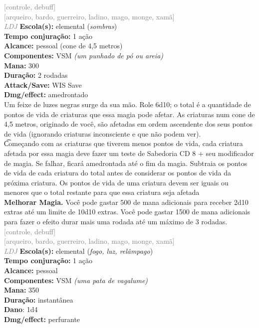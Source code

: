 \documentclass{RPG_Adventure}[2021/10/20]
\begin{document}
{\scriptsize \textcolor{gray}{[controle, debuff]\\}}
{\scriptsize \textcolor{gray}{[arqueiro, bardo, guerreiro, ladino, mago, monge, xamã]\\}}
{\tiny \textcolor{gray}{\textit{LDJ}}}\jump{}
{\small \t \textbf{Escola(s):} elemental (\textit{sombras})\\\t \textbf{Tempo conjuração:} 1 ação\\\t \textbf{Alcance:} pessoal (cone de 4,5 metros)\\\t \textbf{Componentes:} VSM \textit{(um punhado de pó ou areia)}\\\t \textbf{Mana:} 300\\\t \textbf{Duração:} 2 rodadas\\\t \textbf{Attack/Save:} WIS Save\\\t \textbf{Dmg/effect:} amedrontado\\}
{\normalsize Um feixe de luzes negras surge da sua mão. Role 6d10; o total é a quantidade de pontos de vida de criaturas que essa magia pode afetar. As criaturas num cone de 4,5 metros, originado de você, são afetadas em ordem ascendente dos seus pontos de vida (ignorando criaturas inconsciente e que não podem ver).\\\t Começando com as criaturas que tiverem menos pontos de vida, cada criatura afetada por essa magia deve fazer um teste de Sabedoria CD 8 + seu modificador de magia. Se falhar, ficará amedrontada até o fim da magia. Subtraia os pontos de vida de cada criatura do total antes de considerar os pontos de vida da próxima criatura. Os pontos de vida de uma criatura devem ser iguais ou menores que o total restante para que essa criatura seja afetada\\\t \textbf{Melhorar Magia.} Você pode gastar 500 de mana adicionais para receber 2d10 extras até um limite de 10d10 extras. Você pode gastar 1500 de mana adicionais para fazer o efeito durar mais uma rodada até um máximo de 3 rodadas.\\}
{\scriptsize \textcolor{gray}{[controle, debuff]\\}}
{\scriptsize \textcolor{gray}{[arqueiro, bardo, guerreiro, ladino, mago, monge, xamã]\\}}
{\tiny \textcolor{gray}{\textit{LDJ}}}\jump{}
{\small \t \textbf{Escola(s):} elemental (\textit{fogo, luz, relâmpago})\\\t \textbf{Tempo conjuração:} 1 ação\\\t \textbf{Alcance:} pessoal\\\t \textbf{Componentes:} VSM \textit{(uma pata de vagalume)}\\\t \textbf{Mana:} 350\\\t \textbf{Duração:} instantânea\\\t \textbf{Dano}: 1d4\\\t \textbf{Dmg/effect:} perfurante\\}
\end{document}

